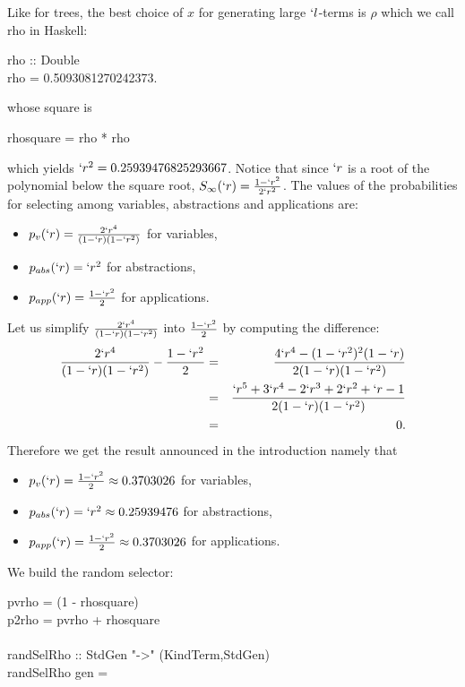 \documentclass{sig-alternate}
\begin{document}
Like for trees,  the best choice of $x$ for generating large
$`l$-terms is $\rho$ which we call \<rho\> in \textsf{Haskell}:
\begin{haskell}
  rho :: Double\\
  rho = 0.5093081270242373.
\end{haskell}
whose square is
\begin{haskell}
  rhosquare = rho * rho
\end{haskell}
which yields $`r^2 = 0.25939476825293667$.  Notice that since $`r$ is a root of the
polynomial below the square root, $S_\infty(`r) = \frac{1-`r^2}{2`r^2}$.  The values
of the probabilities for selecting among variables, abstractions and applications
are:
\begin{itemize}
\item $p_v(`r) = \frac{2`r^4}{(1-`r)(1-`r^2)}$ for variables,
\item $p_{abs}(`r) = `r^2$ for abstractions,
\item $p_{app}(`r) = \frac{1-`r^2}{2}$ for applications.
\end{itemize}
Let us simplify $\frac{2`r^4}{(1-`r)(1-`r^2)}$ into $\frac{1-`r^2}{2}$ by computing
the difference:
\begin{eqnarray*}
  \frac{2`r^4}{(1-`r)(1-`r^2)} - \frac{1-`r^2}{2} &=& \frac{4`r^4 -
    (1-`r^2)^2(1-`r)}{2(1-`r)(1-`r^2)}\\
  &=& \frac{`r^5 + 3`r^4 -2`r^3 + 2`r^2 + `r -1}{2(1-`r)(1-`r^2)}\\
  &=& 0.
\end{eqnarray*}
Therefore we get the result announced in the introduction namely that
\begin{itemize}
\item $p_v(`r) = \frac{1-`r^2}{2} \approx 0.3703026$ for variables,
\item $p_{abs}(`r) = `r^2 \approx 0.25939476$ for abstractions,
\item $p_{app}(`r) = \frac{1-`r^2}{2} \approx 0.3703026$ for applications.
\end{itemize}
We build the random selector:
\begin{haskell}
  \hspace*{-10pt}pvrho = (1 - rhosquare)\\
  \hspace*{-10pt}p2rho = pvrho + rhosquare\\
  ~\\
  \hspace*{-10pt}randSelRho :: StdGen "->" (KindTerm,StdGen)\\
  \hspace*{-10pt}randSelRho gen = 
\end{haskell}
\end{document}
